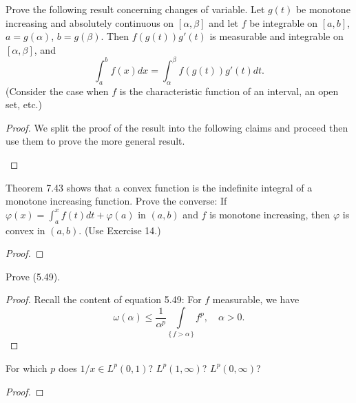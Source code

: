 
\begin{problem}
Prove the following result concerning changes of variable. Let $g(t)$ be
monotone increasing and absolutely continuous on $[\alpha,\beta]$ and let $f$
be integrable on $[a,b]$, $a= g(\alpha)$, $b=
g(\beta)$. Then $f(g(t))g'(t)$ is measurable and integrable on
$[\alpha,\beta]$, and
\[
\int_a^b f(x)d x=\int_\alpha^\beta f(g(t))g'(t)d t.
\]
(Consider the case when $f$ is the characteristic function of an interval,
an open set, etc.)
\end{problem}
\begin{proof}
We split the proof of the result into the following claims and proceed then
use them to prove the more general result.
\begin{claim}

\end{claim}
\end{proof}
\newpage

\begin{problem}
Theorem 7.43 shows that a convex function is the indefinite integral of a
monotone increasing function. Prove the converse: If
$\varphi(x)=\int_a^xf(t)dt+\varphi(a)$ in $(a,b)$ and $f$ is monotone
increasing, then $\varphi$ is convex in $(a,b)$. (Use Exercise 14.)
\end{problem}
\begin{proof}
\end{proof}
\newpage

\begin{problem}
Prove (5.49).
\end{problem}
\begin{proof}
Recall the content of equation 5.49: For $f$ measurable, we have
\begin{equation}
  \label{eq:11:chebyshevs-inequality}
\omega(\alpha)\leq\frac{1}{\alpha^p}\int\limits_{\{\,f>\alpha\,\}}f^p,\quad\alpha>0.
\end{equation}
\end{proof}
\newpage

\begin{problem}
For which $p$ does $1/x\in L^p(0,1)$? $L^p(1,\infty)$? $L^p(0,\infty)$?
\end{problem}
\begin{proof}
\end{proof}
\newpage

